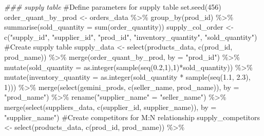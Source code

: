 \documentclass[
  letterpaper,
  DIV=11,
  numbers=noendperiod]{scrartcl}
\newenvironment{Shaded}{\begin{snugshade}}{\end{snugshade}}
\newcommand{\AttributeTok}[1]{\textcolor[rgb]{0.40,0.45,0.13}{#1}}
\newcommand{\CommentTok}[1]{\textcolor[rgb]{0.37,0.37,0.37}{#1}}
\newcommand{\DecValTok}[1]{\textcolor[rgb]{0.68,0.00,0.00}{#1}}
\newcommand{\DocumentationTok}[1]{\textcolor[rgb]{0.37,0.37,0.37}{\textit{#1}}}
\newcommand{\FloatTok}[1]{\textcolor[rgb]{0.68,0.00,0.00}{#1}}
\newcommand{\FunctionTok}[1]{\textcolor[rgb]{0.28,0.35,0.67}{#1}}
\newcommand{\NormalTok}[1]{\textcolor[rgb]{0.00,0.23,0.31}{#1}}
\newcommand{\OtherTok}[1]{\textcolor[rgb]{0.00,0.23,0.31}{#1}}
\newcommand{\SpecialCharTok}[1]{\textcolor[rgb]{0.37,0.37,0.37}{#1}}
\newcommand{\StringTok}[1]{\textcolor[rgb]{0.13,0.47,0.30}{#1}}
\begin{document}
\begin{Shaded}
\begin{Highlighting}[numbers=left,,]
\DocumentationTok{\#\#\# \textquotesingle{}supply\textquotesingle{} table}
\CommentTok{\#Define parameters for supply table}
\FunctionTok{set.seed}\NormalTok{(}\DecValTok{456}\NormalTok{)}
\NormalTok{order\_quant\_by\_prod }\OtherTok{\textless{}{-}}\NormalTok{ orders\_data }\SpecialCharTok{\%\textgreater{}\%}
  \FunctionTok{group\_by}\NormalTok{(prod\_id) }\SpecialCharTok{\%\textgreater{}\%} \FunctionTok{summarise}\NormalTok{(}\AttributeTok{sold\_quantity =} \FunctionTok{sum}\NormalTok{(order\_quantity))}
\NormalTok{supply\_col\_order }\OtherTok{\textless{}{-}} \FunctionTok{c}\NormalTok{(}\StringTok{"supply\_id"}\NormalTok{, }\StringTok{"supplier\_id"}\NormalTok{, }\StringTok{"prod\_id"}\NormalTok{, }
                      \StringTok{"inventory\_quantity"}\NormalTok{, }\StringTok{"sold\_quantity"}\NormalTok{)}
\CommentTok{\#Create supply table}
\NormalTok{supply\_data }\OtherTok{\textless{}{-}} \FunctionTok{select}\NormalTok{(products\_data, }\FunctionTok{c}\NormalTok{(prod\_id, prod\_name)) }\SpecialCharTok{\%\textgreater{}\%}
  \FunctionTok{merge}\NormalTok{(order\_quant\_by\_prod, }\AttributeTok{by =} \StringTok{"prod\_id"}\NormalTok{) }\SpecialCharTok{\%\textgreater{}\%}
  \FunctionTok{mutate}\NormalTok{(}\AttributeTok{sold\_quantity =} \FunctionTok{as.integer}\NormalTok{(}\FunctionTok{sample}\NormalTok{(}\FunctionTok{seq}\NormalTok{(}\FloatTok{0.2}\NormalTok{,}\DecValTok{1}\NormalTok{),}\DecValTok{1}\NormalTok{)}\SpecialCharTok{*}\NormalTok{sold\_quantity)) }\SpecialCharTok{\%\textgreater{}\%}
  \FunctionTok{mutate}\NormalTok{(}\AttributeTok{inventory\_quantity =} 
           \FunctionTok{as.integer}\NormalTok{(sold\_quantity }\SpecialCharTok{*} \FunctionTok{sample}\NormalTok{(}\FunctionTok{seq}\NormalTok{(}\FloatTok{1.1}\NormalTok{, }\FloatTok{2.3}\NormalTok{), }\DecValTok{1}\NormalTok{))) }\SpecialCharTok{\%\textgreater{}\%}
  \FunctionTok{merge}\NormalTok{(}\FunctionTok{select}\NormalTok{(gemini\_prods, }\FunctionTok{c}\NormalTok{(seller\_name, prod\_name)), }\AttributeTok{by =} \StringTok{"prod\_name"}\NormalTok{) }\SpecialCharTok{\%\textgreater{}\%}
  \FunctionTok{rename}\NormalTok{(}\StringTok{"supplier\_name"} \OtherTok{=} \StringTok{"seller\_name"}\NormalTok{) }\SpecialCharTok{\%\textgreater{}\%}
  \FunctionTok{merge}\NormalTok{(}\FunctionTok{select}\NormalTok{(suppliers\_data, }\FunctionTok{c}\NormalTok{(supplier\_id, supplier\_name)), }
        \AttributeTok{by =} \StringTok{"supplier\_name"}\NormalTok{)}
\CommentTok{\#Create competitors for M:N relationship}
\NormalTok{supply\_competitors }\OtherTok{\textless{}{-}} \FunctionTok{select}\NormalTok{(products\_data, }\FunctionTok{c}\NormalTok{(prod\_id, prod\_name)) }\SpecialCharTok{\%\textgreater{}\%}

\end{Highlighting}
\end{Shaded}
\end{document}
